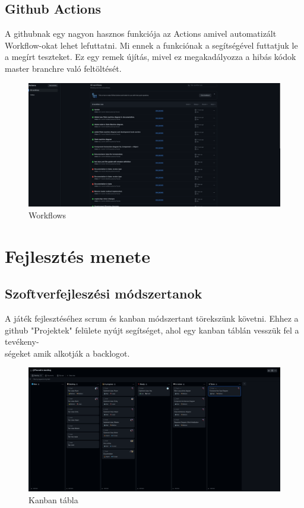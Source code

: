 \documentclass{scrarticle}
\begin{document}
\subsection{Github Actions}
A githubnak egy nagyon hasznos funkciója az Actions amivel automatizált Workflow-okat lehet lefuttatni. Mi ennek a funkciónak a segítségével futtatjuk le a megírt teszteket. Ez egy remek újítás, mivel ez megakadályozza a hibás kódok master branchre való feltöltését.
\begin{figure}[H]
    \includegraphics[width=1.0\columnwidth]{github_actions.png}
    \caption{Workflows}\label{fig:6}
\end{figure}
\newpage

\section{Fejlesztés menete}
\subsection{Szoftverfejleszési módszertanok}
A játék fejlesztéséhez scrum és kanban módszertant törekszünk követni. Ehhez a github "Projektek" felülete nyújt segítséget, ahol egy kanban táblán vesszük fel a tevékeny-\\ségeket amik alkotják a backlogot.
\begin{figure}[H]
    \includegraphics[width=1.0\columnwidth]{kanban_scrum.png}
    \caption{Kanban tábla}\label{fig:7}
\end{figure}
\newpage
\end{document}

